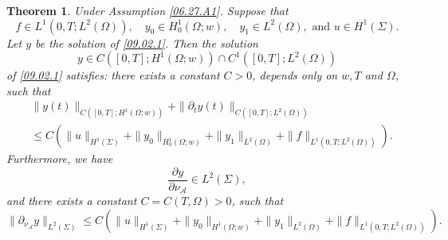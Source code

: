 \documentclass[10pt,a4paper]{amsart}
\newtheorem{theorem}{Theorem}
\def\Om{\Omega}
\def\f{\frac}
\def\mcA{\mathcal{A}}
\def\pt{\partial}
\begin{document}
\begin{theorem}\label{09.02.T1}
	Under Assumption \ref{06.27.A1}. Suppose that 
	\begin{equation*}
		f\in L^1(0,T; L^2(\Om)),\quad y_0\in H_0^1(\Om;w),\quad y_1\in L^2(\Om), \mbox{ and } u\in H^1(\Sigma). 
	\end{equation*} 
	Let $y$ be the solution of \eqref{09.02.1}. 	
	Then the solution
	\begin{equation*}
		y\in C([0,T]; H^1(\Om;w))\cap C^1([0,T]; L^2(\Om))
	\end{equation*}
	of \eqref{09.02.1} satisfies: there exists a constant $C>0$, depends only on $w, T$ and $\Om$,  such that 
	\begin{equation}\label{09.04.1}
		\begin{split} 
		&\|y(t)\|_{C([0,T];H^1(\Om;w))}+\|\pt_t y(t)\|_{C([0,T]; L^2(\Om))}\\
		&\leq C\left(\|u\|_{H^1(\Sigma)}+\|y_0\|_{H_0^1(\Om;w)}+\|y_1\|_{L^2(\Om)}+\|f\|_{L^1(0,T; L^2(\Om))}\right).
		\end{split} 
	\end{equation}
	Furthermore, we have 
	\begin{equation*}
		\f{\pt y}{\pt \nu_\mcA}\in L^2(\Sigma), 
	\end{equation*}
	and there exists a constant $C=C(T,\Om)>0$, such that 
	\begin{equation}\label{09.04.2}
		\|\pt_{\nu_\mcA} y\|_{L^2(\Sigma)}\leq C\left(\|u\|_{H^1(\Sigma)}+\|y_0\|_{H^1(\Om;w)}+\|y_1\|_{L^2(\Om)}+\|f\|_{L^1(0,T; L^2(\Om))}\right).
	\end{equation}
\end{theorem}
\end{document}

